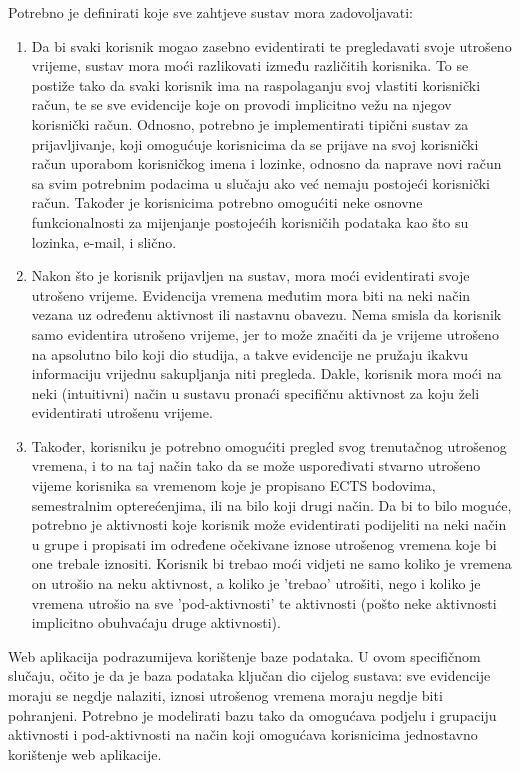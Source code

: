 \documentclass[times, utf8, zavrsni]{fer}
\begin{document}
Potrebno je definirati koje sve zahtjeve sustav mora zadovoljavati:
\begin{enumerate}
\item Da bi svaki korisnik mogao zasebno evidentirati te pregledavati svoje utrošeno vrijeme, sustav mora moći razlikovati između različitih korisnika. To se postiže tako da svaki korisnik ima na raspolaganju svoj vlastiti korisnički račun, te se sve evidencije koje on provodi implicitno vežu na njegov korisnički račun. Odnosno, potrebno je implementirati tipični sustav za prijavljivanje, koji omogućuje korisnicima da se prijave na svoj korisnički račun uporabom korisničkog imena i lozinke, odnosno da naprave novi račun sa svim potrebnim podacima u slučaju ako već nemaju postojeći korisnički račun. Također je korisnicima potrebno omogućiti neke osnovne funkcionalnosti za mijenjanje postojećih korisničih podataka kao što su lozinka, e-mail, i slično.

\item Nakon što je korisnik prijavljen na sustav, mora moći evidentirati svoje utrošeno vrijeme. Evidencija vremena međutim mora biti na neki način vezana uz određenu aktivnost ili nastavnu obavezu. Nema smisla da korisnik samo evidentira utrošeno vrijeme, jer to može značiti da je vrijeme utrošeno na apsolutno bilo koji dio studija, a takve evidencije ne pružaju ikakvu informaciju vrijednu sakupljanja niti pregleda. Dakle, korisnik mora moći na neki (intuitivni) način u sustavu pronaći specifičnu aktivnost za koju želi evidentirati utrošenu vrijeme.

\item Također, korisniku je potrebno omogućiti pregled svog trenutačnog utrošenog vremena, i to na taj način tako da se može uspoređivati stvarno utrošeno vijeme korisnika sa vremenom koje je propisano ECTS bodovima, semestralnim opterećenjima, ili na bilo koji drugi način. Da bi to bilo moguće, potrebno je aktivnosti koje korisnik može evidentirati podijeliti na neki način u grupe i propisati im određene očekivane iznose utrošenog vremena koje bi one trebale iznositi. Korisnik bi trebao moći vidjeti ne samo koliko je vremena on utrošio na neku aktivnost, a koliko je 'trebao' utrošiti, nego i koliko je vremena utrošio na sve 'pod-aktivnosti' te aktivnosti (pošto neke aktivnosti implicitno obuhvaćaju druge aktivnosti).
\end{enumerate}

Web aplikacija podrazumijeva korištenje baze podataka. U ovom specifičnom slučaju, očito je da je baza podataka ključan dio cijelog sustava: sve evidencije moraju se negdje nalaziti, iznosi utrošenog vremena moraju negdje biti pohranjeni. Potrebno je modelirati bazu tako da omogućava podjelu i grupaciju aktivnosti i pod-aktivnosti na način koji omogućava korisnicima jednostavno korištenje web aplikacije.\\
\end{document}
